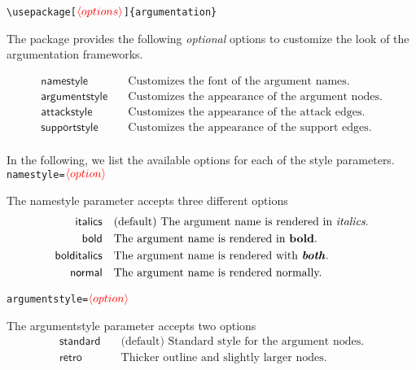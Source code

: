 \documentclass{article}
\newcommand{\opt}[2][red]{\ensuremath{\textcolor{#1}{\langle #2\rangle}}}
\begin{document}
    \noindent
    \verb|\usepackage[|\opt{options}\verb|]{argumentation}|
    
    \begin{list}{}{\leftmargin=\parindent\rightmargin=0pt}
        \item The package provides the following \emph{optional} options to customize the look of the argumentation frameworks.
    \end{list}
    \begin{align*}
        \mathsf{namestyle} &\quad \text{Customizes the font of the argument names.}\\
        \mathsf{argumentstyle} &\quad \text{Customizes the appearance of the argument nodes.}\\
        \mathsf{attackstyle} &\quad \text{Customizes the appearance of the attack edges.}\\
        \mathsf{supportstyle} &\quad \text{Customizes the appearance of the support edges.}\\
    \end{align*}

    In the following, we list the available options for each of the style parameters.\\

\noindent\texttt{namestyle=}\opt{option}
    
    The \textsf{namestyle} parameter accepts three different options
    \begin{align*}
        \mathsf{italics} &\quad \text{(default) The argument name is rendered in \emph{italics}.}\\
        \mathsf{bold} &\quad \text{The argument name is rendered in \textbf{bold}.}\\
        \mathsf{bolditalics} &\quad \text{The argument name is rendered with \textbf{\emph{both}}.}\\
        \mathsf{normal} &\quad \text{The argument name is rendered normally.}\\
    \end{align*}

\noindent\texttt{argumentstyle=}\opt{option}

    The \textsf{argumentstyle} parameter accepts two options
    \begin{align*}
        \mathsf{standard} &\quad \text{(default) Standard style for the argument nodes.}\\
        \mathsf{retro} &\quad \text{Thicker outline and slightly larger nodes.}\\
    \end{align*}
\end{document}

